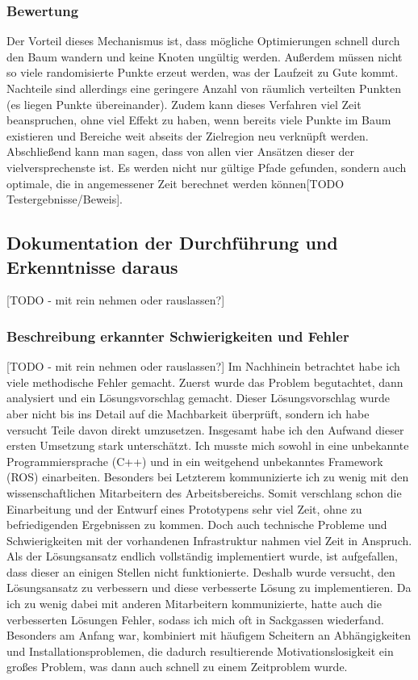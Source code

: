 \subsubsection{Bewertung}
Der Vorteil dieses Mechanismus ist, dass mögliche Optimierungen schnell durch den Baum wandern und keine Knoten ungültig werden. Außerdem müssen nicht so viele randomisierte Punkte erzeut werden, was der Laufzeit zu Gute kommt.\\
 Nachteile sind allerdings eine geringere Anzahl von räumlich verteilten Punkten (es liegen Punkte \glqq übereinander\grqq). Zudem kann dieses Verfahren viel Zeit beanspruchen, ohne viel Effekt zu haben, wenn bereits viele Punkte im Baum existieren und Bereiche weit abseits der Zielregion neu verknüpft werden. \\
 Abschließend kann man sagen, dass von allen vier Ansätzen dieser der vielversprechenste ist. Es werden nicht nur gültige Pfade gefunden, sondern auch optimale, die in angemessener Zeit berechnet werden können[TODO Testergebnisse/Beweis].


\subsection{Dokumentation der Durchführung und Erkenntnisse daraus}
[TODO - mit rein nehmen oder rauslassen?] 



\subsubsection{Beschreibung erkannter Schwierigkeiten und Fehler}
[TODO - mit rein nehmen oder rauslassen?] 
Im Nachhinein betrachtet habe ich viele methodische Fehler gemacht. Zuerst wurde das Problem begutachtet, dann analysiert und ein Lösungsvorschlag gemacht. Dieser Lösungsvorschlag wurde aber nicht bis ins Detail auf die Machbarkeit überprüft, sondern ich habe versucht Teile davon direkt umzusetzen. Insgesamt habe ich den Aufwand dieser ersten Umsetzung stark unterschätzt. Ich musste mich sowohl in eine unbekannte Programmiersprache (C++) und in ein weitgehend unbekanntes Framework (ROS) einarbeiten. Besonders bei Letzterem kommunizierte ich zu wenig mit den wissenschaftlichen Mitarbeitern des Arbeitsbereichs. Somit verschlang schon die Einarbeitung und der Entwurf eines Prototypens sehr viel Zeit, ohne zu befriedigenden Ergebnissen zu kommen. Doch auch technische Probleme und Schwierigkeiten mit der vorhandenen Infrastruktur nahmen viel Zeit in Anspruch.\\
Als der Lösungsansatz endlich vollständig implementiert wurde, ist aufgefallen, dass dieser an einigen Stellen nicht funktionierte. Deshalb wurde versucht, den Lösungsansatz zu verbessern und diese verbesserte Lösung zu implementieren. Da ich zu wenig dabei mit anderen Mitarbeitern kommunizierte, hatte auch die verbesserten Lösungen Fehler, sodass ich mich oft in Sackgassen wiederfand. \\
Besonders am Anfang war, kombiniert mit häufigem Scheitern an Abhängigkeiten und Installationsproblemen, die dadurch resultierende Motivationslosigkeit ein großes Problem, was dann auch schnell zu einem Zeitproblem wurde. 


